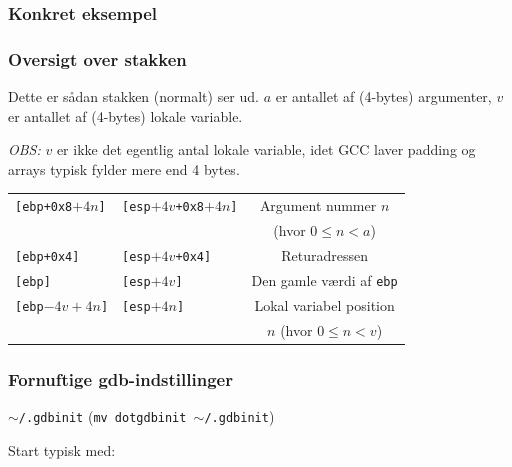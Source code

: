 \documentclass[slidestop,compress,mathserif, xcolor=table]{beamer}
\begin{document}
\begin{frame}[c]
    \frametitle{Konkret eksempel}

    \pause

    \pause

\end{frame}

\begin{frame}[c]
    \frametitle{Oversigt over stakken}

    Dette er sådan stakken (normalt) ser ud. $a$ er antallet af (4-bytes)
    argumenter, $v$ er antallet af (4-bytes) lokale variable. \vskip8pt

    \pause\emph{OBS:} $v$ er ikke det egentlig antal lokale variable, idet GCC
    laver padding og arrays typisk fylder mere end 4 bytes. \vskip8pt

    \pause
    \begin{tabular}{|l|l|c|}
    \hline
    \texttt{[ebp+0x8$+4n$]} & \texttt{[esp$+4v$+0x8$+4n$]}  & Argument nummer $n$ \\
                            &                               & (hvor $0 \leq n < a$) \\\hline
    \texttt{[ebp+0x4]}      & \texttt{[esp$+4v$+0x4]}       & Returadressen \\\hline
    \texttt{[ebp]}          & \texttt{[esp$+4v$]}           & Den gamle værdi af \texttt{ebp}\\\hline
    \texttt{[ebp$-4v+4n$]}  & \texttt{[esp$+4n$]}           & Lokal variabel position \\
                            &                               & $n$ (hvor $0 \leq n < v$) \\\hline
    \end{tabular}
\end{frame}

\begin{frame}[c]
    \frametitle{Fornuftige gdb-indstillinger}

    \texttt{$\sim$/.gdbinit} (\texttt{mv dotgdbinit $\sim$/.gdbinit})

    

    Start typisk med:
    
\end{frame}
\end{document}
